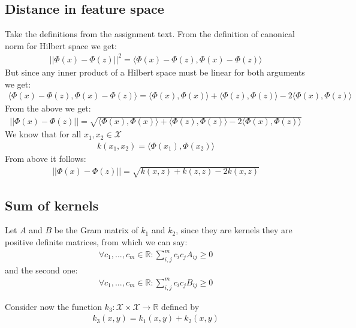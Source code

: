\subsection{Distance in feature space}
Take the definitions from the assignment text.
From the definition of canonical norm for Hilbert space we get:
\begin{align}
||\Phi(x) - \Phi(z) ||^2 = \langle \Phi(x) - \Phi(z),\Phi(x) - \Phi(z) \rangle
\end{align}
But since any inner product of a Hilbert space must be linear for both arguments we get:
\begin{align}
\langle \Phi(x) - \Phi(z),\Phi(x) - \Phi(z) \rangle = 
\langle \Phi(x),\Phi(x) \rangle + \langle \Phi(z),\Phi(z) \rangle - 2\langle \Phi(x) , \Phi(z) \rangle
\end{align}
From the above we get:
\begin{align}
||\Phi(x) - \Phi(z) || = \sqrt{\langle \Phi(x),\Phi(x) \rangle + \langle \Phi(z),\Phi(z) \rangle - 2\langle \Phi(x) , \Phi(z) \rangle}
\end{align}
We know that for all $x_1, x_2 \in \mathcal{X}$
\begin{align}
k(x_1,x_2)=\langle \Phi(x_1), \Phi(x_2) \rangle
\end{align}
From above it follows:
\begin{align}
||\Phi(x) - \Phi(z) || = \sqrt{k(x,z) + k(z,z) - 2k(x,z)}
\end{align}


\subsection{Sum of kernels}

Let $A$ and $B$ be the Gram matrix of $k_1$ and $k_2$, since they are kernels they are positive definite matrices, from which we can say:
\begin{align}
\forall c_1,...,c_m \in \mathbb{R}: \sum_{i,j}^m c_i c_j A_{ij} \geq 0
\end{align}
and the second one: 
\begin{align}
\forall c_1,...,c_m \in \mathbb{R}: \sum_{i,j}^m c_i c_j B_{ij} \geq 0
\end{align}

Consider now the function $k_3:\mathcal{X}\times \mathcal{X} \to \mathbb{R}$ defined by
\begin{align}
k_3(x,y) = k_1(x,y) + k_2(x,y)
\end{align}

